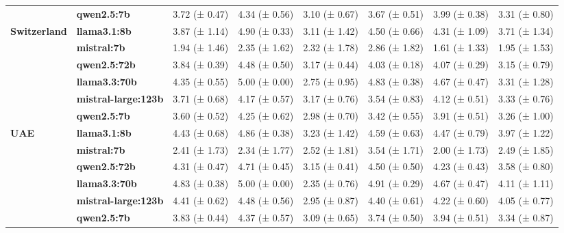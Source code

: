 \begin{longtable}{llllllll}
\textbf{} & \textbf{qwen2.5:7b} & 3.72 (± 0.47) & 4.34 (± 0.56) & 3.10 (± 0.67) & 3.67 (± 0.51) & 3.99 (± 0.38) & 3.31 (± 0.80) \\
\cline{1-8}
\multirow[t]{6}{*}{\textbf{Switzerland}} & \textbf{llama3.1:8b} & 3.87 (± 1.14) & 4.90 (± 0.33) & 3.11 (± 1.42) & 4.50 (± 0.66) & 4.31 (± 1.09) & 3.71 (± 1.34) \\
\textbf{} & \textbf{mistral:7b} & 1.94 (± 1.46) & 2.35 (± 1.62) & 2.32 (± 1.78) & 2.86 (± 1.82) & 1.61 (± 1.33) & 1.95 (± 1.53) \\
\textbf{} & \textbf{qwen2.5:72b} & 3.84 (± 0.39) & 4.48 (± 0.50) & 3.17 (± 0.44) & 4.03 (± 0.18) & 4.07 (± 0.29) & 3.15 (± 0.79) \\
\textbf{} & \textbf{llama3.3:70b} & 4.35 (± 0.55) & 5.00 (± 0.00) & 2.75 (± 0.95) & 4.83 (± 0.38) & 4.67 (± 0.47) & 3.31 (± 1.28) \\
\textbf{} & \textbf{mistral-large:123b} & 3.71 (± 0.68) & 4.17 (± 0.57) & 3.17 (± 0.76) & 3.54 (± 0.83) & 4.12 (± 0.51) & 3.33 (± 0.76) \\
\textbf{} & \textbf{qwen2.5:7b} & 3.60 (± 0.52) & 4.25 (± 0.62) & 2.98 (± 0.70) & 3.42 (± 0.55) & 3.91 (± 0.51) & 3.26 (± 1.00) \\
\cline{1-8}
\multirow[t]{6}{*}{\textbf{UAE}} & \textbf{llama3.1:8b} & 4.43 (± 0.68) & 4.86 (± 0.38) & 3.23 (± 1.42) & 4.59 (± 0.63) & 4.47 (± 0.79) & 3.97 (± 1.22) \\
\textbf{} & \textbf{mistral:7b} & 2.41 (± 1.73) & 2.34 (± 1.77) & 2.52 (± 1.81) & 3.54 (± 1.71) & 2.00 (± 1.73) & 2.49 (± 1.85) \\
\textbf{} & \textbf{qwen2.5:72b} & 4.31 (± 0.47) & 4.71 (± 0.45) & 3.15 (± 0.41) & 4.50 (± 0.50) & 4.23 (± 0.43) & 3.58 (± 0.80) \\
\textbf{} & \textbf{llama3.3:70b} & 4.83 (± 0.38) & 5.00 (± 0.00) & 2.35 (± 0.76) & 4.91 (± 0.29) & 4.67 (± 0.47) & 4.11 (± 1.11) \\
\textbf{} & \textbf{mistral-large:123b} & 4.41 (± 0.62) & 4.48 (± 0.56) & 2.95 (± 0.87) & 4.40 (± 0.61) & 4.22 (± 0.60) & 4.05 (± 0.77) \\
\textbf{} & \textbf{qwen2.5:7b} & 3.83 (± 0.44) & 4.37 (± 0.57) & 3.09 (± 0.65) & 3.74 (± 0.50) & 3.94 (± 0.51) & 3.34 (± 0.87) \\
\cline{1-8}
\end{longtable}
